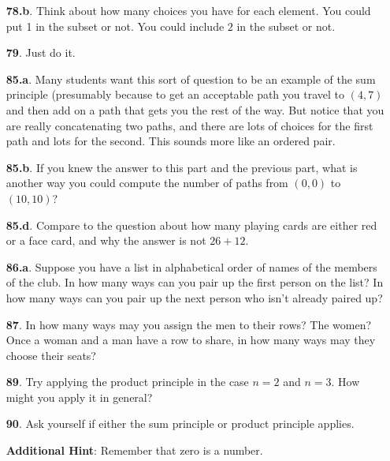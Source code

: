 \documentclass[10pt,]{book}
\theoremstyle{plain}
\theoremstyle{definition}
\theoremstyle{definition}
\theoremstyle{definition}
\numberwithin{equation}{chapter}
\begin{document}
\begin{itemize}[itemsep=1em]
\item[\textbf{78.b}.]\hypertarget{p-583}{}%
Think about how many choices you have for each element.  You could put 1 in the subset or not.  You could include \(2\) in the subset or not.%

\item[\textbf{79}.]\hypertarget{p-588}{}%
Just do it.%

\item[\textbf{85.a}.]\hypertarget{p-626}{}%
Many students want this sort of question to be an example of the sum principle (presumably because to get an acceptable path you travel to \((4,7)\) and then add on a path that gets you the rest of the way.  But notice that you are really concatenating two paths, and there are lots of choices for the first path and lots for the second.  This sounds more like an ordered pair.%

\item[\textbf{85.b}.]\hypertarget{p-628}{}%
If you knew the answer to this part and the previous part, what is another way you could compute the number of paths from \((0,0)\) to \((10,10)\)?%

\item[\textbf{85.d}.]\hypertarget{p-631}{}%
Compare to the question about how many playing cards are either red or a face card, and why the answer is not \(26 + 12\).%

\item[\textbf{86.a}.]\hypertarget{p-636}{}%
Suppose you have a list in alphabetical order of names of the members of the club. In how many ways can you pair up the first person on the list? In how many ways can you pair up the next person who isn't already paired up?%

\item[\textbf{87}.]\hypertarget{p-640}{}%
In how many ways may you assign the men to their rows? The women? Once a woman and a man have a row to share, in how many ways may they choose their seats?%

\item[\textbf{89}.]\hypertarget{p-645}{}%
Try applying the product principle in the case \(n = 2\) and \(n = 3\). How might you apply it in general?%

\item[\textbf{90}.]\hypertarget{p-648}{}%
Ask yourself if either the sum principle or product principle applies.%

\par\smallskip
\noindent\textbf{Additional Hint}: \hypertarget{p-649}{}%
Remember that zero is a number.%


\end{itemize}
\end{document}
